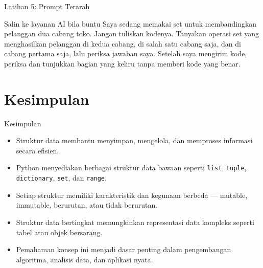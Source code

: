 \documentclass[aspectratio=169, table]{beamer}
\begin{document}
\begin{frame}{Latihan 5: Prompt Terarah}
\begin{block}{Salin ke layanan AI bila buntu}
\small Saya sedang memakai set untuk membandingkan pelanggan dua cabang toko. Jangan tuliskan kodenya. Tanyakan operasi set yang menghasilkan pelanggan di kedua cabang, di salah satu cabang saja, dan di cabang pertama saja, lalu periksa jawaban saya. Setelah saya mengirim kode, periksa dan tunjukkan bagian yang keliru tanpa memberi kode yang benar.
\end{block}
\end{frame}

\section{Kesimpulan}

\begin{frame}{Kesimpulan}
\vspace{20pt}

\begin{itemize}
  \item Struktur data membantu menyimpan, mengelola, dan memproses informasi secara efisien. 
  \item Python menyediakan berbagai struktur data bawaan seperti \texttt{list}, \texttt{tuple}, \texttt{dictionary}, \texttt{set}, dan \texttt{range}.
  \item Setiap struktur memiliki karakteristik dan kegunaan berbeda — mutable, immutable, berurutan, atau tidak berurutan.
  \item Struktur data bertingkat memungkinkan representasi data kompleks seperti tabel atau objek bersarang.
  \item Pemahaman konsep ini menjadi dasar penting dalam pengembangan algoritma, analisis data, dan aplikasi nyata.
\end{itemize}

\end{frame}
\end{document}
